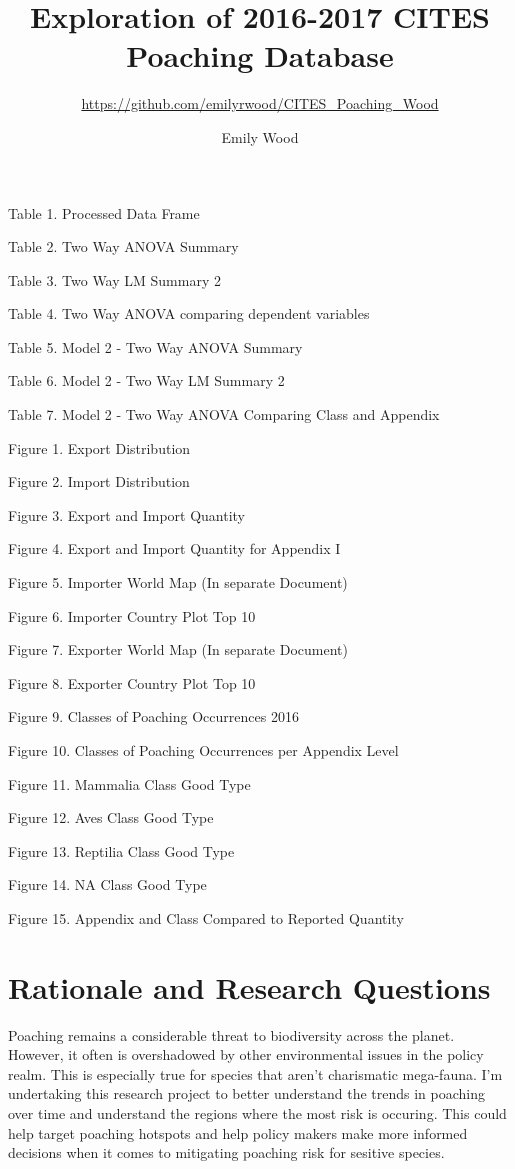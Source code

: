 \documentclass[
  12pt,
]{article}
\title{Exploration of 2016-2017 CITES Poaching Database}
\subtitle{\url{https://github.com/emilyrwood/CITES_Poaching_Wood}}
\author{Emily Wood}
\date{}
\begin{document}
\maketitle

\newpage
\tableofcontents 
\newpage
\listoftables

Table 1. Processed Data Frame

Table 2. Two Way ANOVA Summary

Table 3. Two Way LM Summary 2

Table 4. Two Way ANOVA comparing dependent variables

Table 5. Model 2 - Two Way ANOVA Summary

Table 6. Model 2 - Two Way LM Summary 2

Table 7. Model 2 - Two Way ANOVA Comparing Class and Appendix

\newpage
\listoffigures

Figure 1. Export Distribution

Figure 2. Import Distribution

Figure 3. Export and Import Quantity

Figure 4. Export and Import Quantity for Appendix I

Figure 5. Importer World Map (In separate Document)

Figure 6. Importer Country Plot Top 10

Figure 7. Exporter World Map (In separate Document)

Figure 8. Exporter Country Plot Top 10

Figure 9. Classes of Poaching Occurrences 2016

Figure 10. Classes of Poaching Occurrences per Appendix Level

Figure 11. Mammalia Class Good Type

Figure 12. Aves Class Good Type

Figure 13. Reptilia Class Good Type

Figure 14. NA Class Good Type

Figure 15. Appendix and Class Compared to Reported Quantity \newpage

\hypertarget{rationale-and-research-questions}{%
\section{Rationale and Research
Questions}\label{rationale-and-research-questions}}

Poaching remains a considerable threat to biodiversity across the
planet. However, it often is overshadowed by other environmental issues
in the policy realm. This is especially true for species that aren't
charismatic mega-fauna. I'm undertaking this research project to better
understand the trends in poaching over time and understand the regions
where the most risk is occuring. This could help target poaching
hotspots and help policy makers make more informed decisions when it
comes to mitigating poaching risk for sesitive species.
\end{document}
